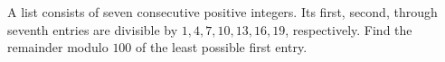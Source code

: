 A list consists of seven consecutive positive integers. Its first, second, through seventh entries are divisible by $1,4,7,10,13,16,19$, respectively. Find the remainder modulo $100$ of the least possible first entry.
